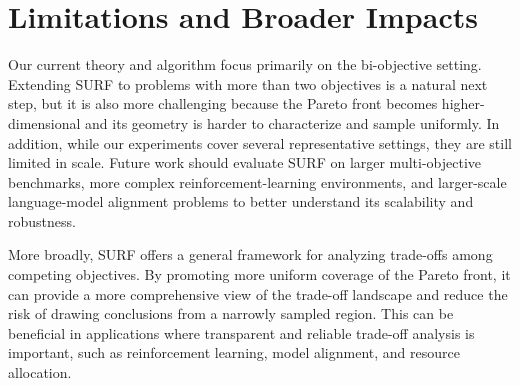 \documentclass{article}
\begin{document}
\section{Limitations and Broader Impacts}\label{app:lim}
Our current theory and algorithm focus primarily on the bi-objective setting. Extending SURF to problems with more than two objectives is a natural next step, but it is also more challenging because the Pareto front becomes higher-dimensional and its geometry is harder to characterize and sample uniformly. In addition, while our experiments cover several representative settings, they are still limited in scale. Future work should evaluate SURF on larger multi-objective benchmarks, more complex reinforcement-learning environments, and larger-scale language-model alignment problems to better understand its scalability and robustness.

More broadly, SURF offers a general framework for analyzing trade-offs among competing objectives. By promoting more uniform coverage of the Pareto front, it can provide a more comprehensive view of the trade-off landscape and reduce the risk of drawing conclusions from a narrowly sampled region. This can be beneficial in applications where transparent and reliable trade-off analysis is important, such as reinforcement learning, model alignment, and resource allocation.
\end{document}
